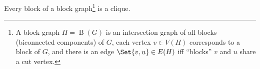 \documentclass[a4paper,12pt]{article}
\newcommand{\op}[1]{\operatorname*{#1}}
\newcommand{\blockGraph}[1]{\op{B}(#1)}
\begin{document}
\begin{tasks}

    \begin{theorem}[Harary]
        Every block of a block graph\footnote{A block graph $H = \blockGraph{G}$ is an intersection graph of all blocks (biconnected components) of $G$, \ie each vertex $v \in V(H)$ corresponds to a block of $G$, and there is an edge $\Set{v,u} \in E(H)$ iff \enquote{blocks} $v$ and $u$ share a cut vertex.} is a clique.
    \end{theorem}

\end{tasks}
\end{document}
